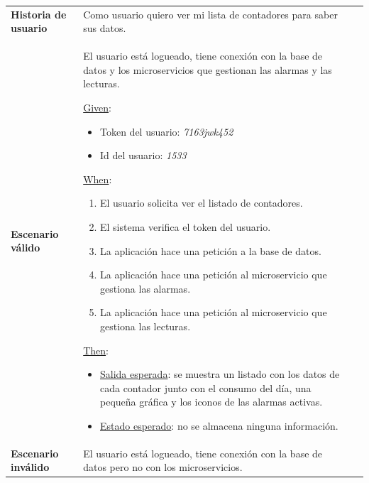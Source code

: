 \documentclass[pdftex,11pt,a4paper]{book}
\begin{document}
\begin{center}
\begin{longtable}{|>{\centering\arraybackslash}X m{2cm}|m{12cm}|}
\hline
\multicolumn{2}{|c|}{\textbf{Prueba de aceptación PA02}}\\
\hline 
\endhead

\textbf{Historia de usuario} & Como usuario quiero ver mi lista de contadores para saber sus datos.
\\ \hline

\textbf{Escenario válido} & El usuario está logueado, tiene conexión con la base de datos y los microservicios que gestionan las alarmas y las lecturas.
\vspace{2mm}
\break

\underline{Given}:
\begin{itemize}
\addtolength{\itemsep}{-3mm}
\item Token del usuario: \textit{7163jwk452}
\item Id del usuario: \textit{1533}
\end{itemize}
\vspace{3mm}

\underline{When}:
\begin{enumerate}
\vspace{-3mm}
\addtolength{\itemsep}{-3mm}
\item El usuario solicita ver el listado de contadores.
\item El sistema verifica el token del usuario.
\item La aplicación hace una petición a la base de datos.
\item La aplicación hace una petición al microservicio que gestiona las alarmas.
\item La aplicación hace una petición al microservicio que gestiona las lecturas.
\end{enumerate}
\break

\underline{Then}:
\vspace{-3mm}
\begin{itemize}
\addtolength{\itemsep}{-3mm}
\item \underline{Salida esperada}:  se muestra un listado con los datos de cada contador junto con el consumo del día, una pequeña gráfica y los iconos de las alarmas activas.
\item \underline{Estado esperado}: no se almacena ninguna información.
\end{itemize}

\\ \hline
\textbf{Escenario inválido} & {\raggedright El usuario está logueado, tiene conexión con la base de datos pero no con los microservicios.\par}
\vspace{2mm}
\break


\end{longtable}
\end{center}
\end{document}
